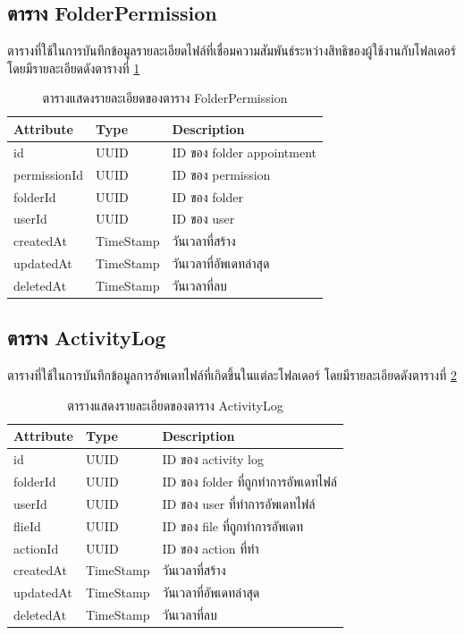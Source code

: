 \documentclass[12pt,oneside,openright,a4paper]{cpe-thai-project}
\begin{document}
\subsection{ตาราง FolderPermission}
ตารางที่ใช้ในการบันทึกข้อมูลรายละเอียดไฟล์ที่เชื่อมความสัมพันธ์ระหว่างสิทธิของผู้ใช้งานกับโฟลเดอร์ โดยมีรายละเอียดดังตารางที่ \ref{tbl:dbFolderPermission}
\begin{table}[!h]
    \centering
    \begin{tabular}{|l|l|l|}
    \hline
    \textbf{Attribute} & \textbf{Type} & \textbf{Description}   \\ \hline
    id           & UUID      & ID ของ folder appointment \\ \hline
    permissionId & UUID      & ID ของ permission         \\ \hline
    folderId     & UUID      & ID ของ folder             \\ \hline
    userId       & UUID      & ID ของ user               \\ \hline
    createdAt    & TimeStamp & วันเวลาที่สร้าง           \\ \hline
    updatedAt    & TimeStamp & วันเวลาที่อัพเดทล่าสุด    \\ \hline
    deletedAt    & TimeStamp & วันเวลาที่ลบ            \\ \hline
    \end{tabular}
    \caption{\centering  ตารางแสดงรายละเอียดของตาราง FolderPermission} \label{tbl:dbFolderPermission}
\end{table}


\subsection{ตาราง ActivityLog}
ตารางที่ใช้ในการบันทึกข้อมูลการอัพเดทไฟล์ที่เกิดขึ้นในแต่ละโฟลเดอร์ โดยมีรายละเอียดดังตารางที่ \ref{tbl:dbActivityLog}
\begin{table}[!h]
    \centering
    \begin{tabular}{|l|l|l|}
    \hline
    \textbf{Attribute} & \textbf{Type} & \textbf{Description}   \\ \hline
    id        & UUID      & ID ของ activity log                 \\ \hline
    folderId  & UUID      & ID ของ folder ที่ถูกทำการอัพเดทไฟล์ \\ \hline
    userId    & UUID      & ID ของ user ที่ทำการอัพเดทไฟล์      \\ \hline
    flieId    & UUID      & ID ของ file ที่ถูกทำการอัพเดท       \\ \hline
    actionId  & UUID      & ID ของ action ที่ทำ                 \\ \hline
    createdAt & TimeStamp & วันเวลาที่สร้าง                     \\ \hline
    updatedAt & TimeStamp & วันเวลาที่อัพเดทล่าสุด              \\ \hline
    deletedAt & TimeStamp & วันเวลาที่ลบ                      \\ \hline
    \end{tabular}
    \caption{\centering  ตารางแสดงรายละเอียดของตาราง ActivityLog} \label{tbl:dbActivityLog}
\end{table}
\end{document}
